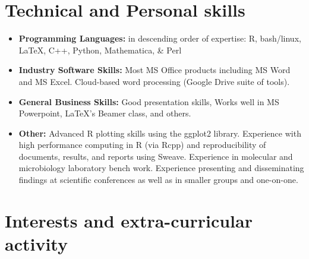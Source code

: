 \documentclass[11pt,a4paper,sans]{moderncv}        %
\begin{document}
\section{Technical and Personal skills}

\vspace{6pt}

\begin{itemize}

\item \textbf{Programming Languages:} in descending order of expertise: R, bash/linux, \LaTeX, C++, Python, Mathematica, \& Perl 

\vspace{6pt}

\item \textbf{Industry Software Skills:} Most MS Office products including MS Word and MS Excel. Cloud-based word processing (Google Drive suite of tools).

\vspace{6pt}

\item \textbf{General Business Skills:} Good presentation skills, Works well in MS Powerpoint, \LaTeX's Beamer class, and others. 

\vspace{6pt}

\item \textbf{Other:} Advanced R plotting skills using the ggplot2 library. Experience with high performance computing in R (via Rcpp) and reproducibility of documents, results, and reports using Sweave.  Experience in molecular and microbiology laboratory bench work. Experience presenting and disseminating findings at scientific conferences as well as in smaller groups and one-on-one. 

\end{itemize}

\section{Interests and extra-curricular activity}

\vspace{6pt}
\end{document}
